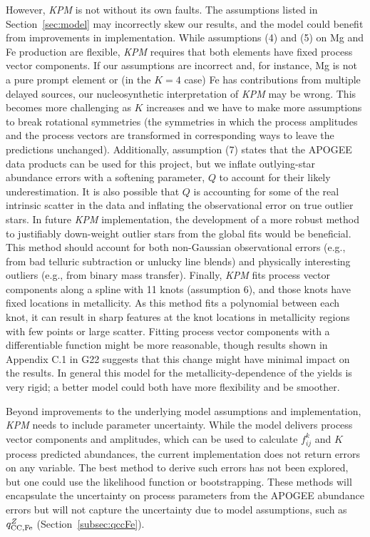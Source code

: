 \documentclass[modern]{aastex631}
\newcommand{\qccFe}{q_{{\rm CC, Fe}}^{Z}}
\newcommand{\name}{\textsl{KPM}}
\begin{document}
However, \name{} is not without its own faults. The assumptions listed in Section~\ref{sec:model} may incorrectly skew our results, and the model could benefit from improvements in implementation. While assumptions (4) and (5) on Mg and Fe production are flexible, \name{} requires that both elements have fixed process vector components. If our assumptions are incorrect and, for instance, Mg is not a pure prompt element or (in the $K=4$ case) Fe has contributions from multiple delayed sources, our nucleosynthetic interpretation of \name{} may be wrong. This becomes more challenging as $K$ increases and we have to make more assumptions to break rotational symmetries (the symmetries in which the process amplitudes and the process vectors are transformed in corresponding ways to leave the predictions unchanged). Additionally, assumption (7) states that the APOGEE data products can be used for this project, but we inflate outlying-star abundance errors with a softening parameter, $Q$ to account for their likely underestimation. It is also possible that $Q$ is accounting for some of the real intrinsic scatter in the data and inflating the observational error on true outlier stars. In future \name{} implementation, the development of a more robust method to justifiably down-weight outlier stars from the global fits would be beneficial. This method should account for both non-Gaussian observational errors (e.g., from bad telluric subtraction or unlucky line blends) and physically interesting outliers (e.g., from binary mass transfer).
Finally, \name{} fits process vector components along a spline with 11 knots (assumption 6), and those knots have fixed locations in metallicity.
As this method fits a polynomial between each knot, it can result in sharp features at the knot locations in metallicity regions with few points or large scatter. Fitting process vector components with a differentiable function might be more reasonable, though results shown in Appendix C.1 in G22 suggests that this change might have minimal impact on the results. 
In general this model for the metallicity-dependence of the yields is very rigid; a better model could both have more flexibility and be smoother.

Beyond improvements to the underlying model assumptions and implementation, \name{} needs to include parameter uncertainty. While the model delivers process vector components and amplitudes, which can be used to calculate $f^{k}_{ij}$ and $K$ process predicted abundances, the current implementation does not return errors on any variable. The best method to derive such errors has not been explored, but one could use the likelihood function or bootstrapping. These methods will encapsulate the uncertainty on process parameters from the APOGEE abundance errors but will not capture the uncertainty due to model assumptions, such as $\qccFe$ (Section~\ref{subsec:qccFe}). 
\end{document}
